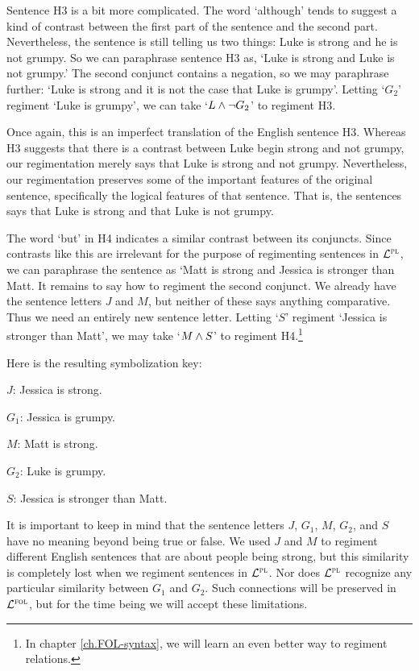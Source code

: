 Sentence H3 is a bit more complicated.
The word `although' tends to suggest a kind of contrast between the first part of the sentence and the second part.
Nevertheless, the sentence is still telling us two things: Luke is strong and he is not grumpy.
So we can paraphrase sentence H3 as, `Luke is strong and Luke is not grumpy.'
The second conjunct contains a negation, so we may paraphrase further: `Luke is strong and it is not the case that Luke is grumpy'.
Letting `$G_{2}$' regiment `Luke is grumpy', we can take `$L\wedge\neg G_{2}$' to regiment H3.

Once again, this is an imperfect translation of the English sentence H3.
Whereas H3 suggests that there is a contrast between Luke begin strong and not grumpy, our regimentation merely says that Luke is strong and not grumpy.
Nevertheless, our regimentation preserves some of the important features of the original sentence, specifically the logical features of that sentence.
That is, the sentences says that Luke is strong and that Luke is not grumpy.

The word `but' in H4 indicates a similar contrast between its conjuncts.
Since contrasts like this are irrelevant for the purpose of regimenting sentences in $\mathcal{L}^{\textsc{pl}}$, we can paraphrase the sentence as `Matt is strong and Jessica is stronger than Matt.
It remains to say how to regiment the second conjunct.
We already have the sentence letters $J$ and $M$, but neither of these says anything comparative.
Thus we need an entirely new sentence letter.
Letting `$S$' regiment `Jessica is stronger than Matt', we may take `$M \wedge S$' to regiment H4.\footnote{In chapter \ref{ch.FOL-syntax}, we will learn an even better way to regiment relations.}

Here is the resulting symbolization key:

\begin{ekey}
  \item[$J$:] Jessica is strong.
  \item[$G_1$:] Jessica is grumpy.
  \item[$M$:] Matt is strong.
  \item[$G_2$:] Luke is grumpy.
  \item[$S$:] Jessica is stronger than Matt.
\end{ekey}


It is important to keep in mind that the sentence letters $J$, $G_{1}$, $M$, $G_{2}$, and $S$ have no meaning beyond being true or false.
We used $J$ and $M$ to regiment different English sentences that are about people being strong, but this similarity is completely lost when we regiment sentences in $\mathcal{L}^{\textsc{pl}}$.
Nor does $\mathcal{L}^{\textsc{pl}}$ recognize any particular similarity between $G_{1}$ and $G_{2}$.
Such connections will be preserved in $\mathcal{L}^{\textsc{fol}}$, but for the time being we will accept these limitations.


